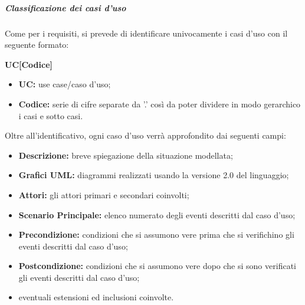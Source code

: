 			\subparagraph{Classificazione dei casi d'uso}
			Come per i requisiti, si prevede di identificare univocamente i casi d'uso con il seguente formato:
			\begin{center}
				\textbf{UC[Codice]}
			\end{center}
			\begin{itemize}
				\item \textbf{UC:} use case/caso d'uso;
				\item \textbf{Codice:} serie di cifre separate da ’.’ così da poter dividere in modo gerarchico i casi e sotto casi.
			\end{itemize}
			Oltre all'identificativo, ogni caso d'uso verrà approfondito dai seguenti campi:
			\begin{itemize}
				\item \textbf{Descrizione:} breve spiegazione della situazione modellata;
				\item \textbf{Grafici UML:} diagrammi realizzati usando la versione 2.0 del linguaggio;
				\item \textbf{Attori:} gli attori primari e secondari coinvolti;
				\item \textbf{Scenario Principale:} elenco numerato degli eventi descritti dal caso d'uso;
				\item \textbf{Precondizione:} condizioni che si assumono vere prima che si verifichino gli eventi descritti dal caso d'uso;
				\item \textbf{Postcondizione:} condizioni che si assumono vere dopo che si sono verificati gli eventi descritti dal caso d'uso;
				\item eventuali estensioni ed inclusioni coinvolte.
			\end{itemize}
					
